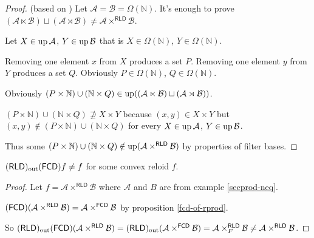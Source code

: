 \begin{proof}
(based on \cite{MO72638}) Let $\mathcal{A}=\mathcal{B}=\Omega(\mathbb{N})$.
It's enough to prove $(\mathcal{A}\ltimes\mathcal{B})\sqcup(\mathcal{A}\rtimes\mathcal{B})\neq\mathcal{A}\times^{\mathsf{RLD}}\mathcal{B}$.

Let $X\in\operatorname{up}\mathcal{A}$, $Y\in\operatorname{up}\mathcal{B}$ that is $X\in\Omega(\mathbb{N})$,
$Y\in\Omega(\mathbb{N})$.

Removing one element $x$ from $X$ produces a set $P$. Removing
one element $y$ from $Y$ produces a set $Q$. Obviously $P\in\Omega(\mathbb{N})$,
$Q\in\Omega(\mathbb{N})$.

Obviously $(P\times\mathbb{N})\cup(\mathbb{N}\times Q)\in\operatorname{up}((\mathcal{A}\ltimes\mathcal{B})\sqcup(\mathcal{A}\rtimes\mathcal{B}))$.

$(P\times\mathbb{N})\cup(\mathbb{N}\times Q)\nsupseteq X\times Y$
because $(x,y)\in X\times Y$ but $(x,y)\notin(P\times\mathbb{N})\cup(\mathbb{N}\times Q)$
for every $X\in\operatorname{up}\mathcal{A}$, $Y\in\operatorname{up}\mathcal{B}$.

Thus some $(P\times\mathbb{N})\cup(\mathbb{N}\times Q)\notin\operatorname{up}(\mathcal{A}\times^{\mathsf{RLD}}\mathcal{B})$
by properties of filter bases.\end{proof}
\begin{example}
$(\mathsf{RLD})_{\mathrm{out}}(\mathsf{FCD}) f\ne f$ for some convex reloid $f$.\end{example}
\begin{proof}
Let $f=\mathcal{A}\times^{\mathsf{RLD}}\mathcal{B}$ where $\mathcal{A}$
and $B$ are from example \ref{secprod-neq}.

$(\mathsf{FCD})(\mathcal{A}\times^{\mathsf{RLD}}\mathcal{B})=\mathcal{A}\times^{\mathsf{FCD}}\mathcal{B}$
by proposition \ref{fcd-of-rprod}.

So $(\mathsf{RLD})_{\mathrm{out}}(\mathsf{FCD})(\mathcal{A}\times^{\mathsf{RLD}}\mathcal{B})=(\mathsf{RLD})_{\mathrm{out}}(\mathcal{A}\times^{\mathsf{FCD}}\mathcal{B})=\mathcal{A}\times_{F}^{\mathsf{RLD}}\mathcal{B}\ne\mathcal{A}\times^{\mathsf{RLD}}\mathcal{B}$.\end{proof}

